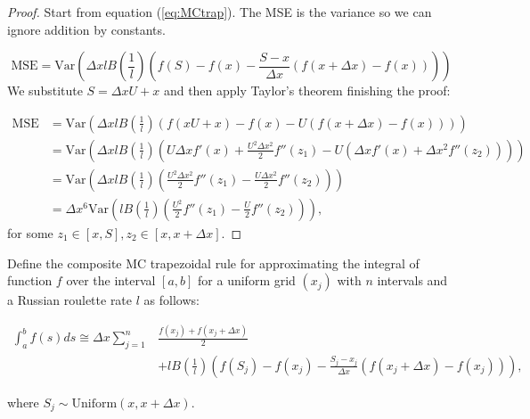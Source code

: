 \documentclass[a4paper,12pt]{article}
\begin{document}
\begin{proof}
    Start from equation (\ref{eq:MCtrap}). The MSE is the variance
    so we can ignore addition by constants.

    \begin{equation}
        \text{MSE} = \text{Var}\left( \Delta x l B\left( \frac{1}{l}\right)
        \left(f(S) - f(x) - \frac{S - x}{\Delta x}
        \left(f(x+\Delta x) - f(x)\right) \right)\right)
    \end{equation}
    We substitute $S = \Delta x U + x$ and then apply Taylor's theorem
    finishing the proof:

    \begin{align}
        \text{MSE} & = \text{Var}\left( \Delta x l B\left( \frac{1}{l}\right)
        \left(f(xU+x) - f(x) - U
        \left(f(x+\Delta x) - f(x)\right) \right)\right)                           \\
                   & = \text{Var}\left( \Delta x l B\left( \frac{1}{l}\right)
        \left( U \Delta x f'(x)+ \frac{U^{2} \Delta x ^{2}}{2} f''(z_{1})
        - U \left( \Delta x f'(x) +
        \Delta x ^{2} f''(z_{2})\right) \right)\right)                             \\
                   & = \text{Var}\left( \Delta x l B\left( \frac{1}{l}\right)
        \left( \frac{U^{2} \Delta x ^{2}}{2} f''(z_{1})
        -  \frac{U\Delta x ^{2}}{2} f''(z_{2}) \right)\right)                      \\
                   & =\Delta x ^{6} \text{Var}\left(  l B\left( \frac{1}{l}\right)
        \left( \frac{U^{2} }{2} f''(z_{1})
        -  \frac{U}{2} f''(z_{2}) \right)\right),
    \end{align}
    for some $z_{1} \in [x,S], z_{2} \in [x,x+\Delta x]$.
\end{proof}


\begin{definition} \label{MCtrap}
    Define the composite MC trapezoidal rule for approximating the integral
    of function $f$ over the interval $[a, b]$ for a uniform grid $(x_{j})$ with $n$
    intervals and a Russian roulette rate $l$ as follows:

    \begin{align} \label{eq:cMCtrap}
        \int_{a}^{b} f(s) ds \cong \Delta x \sum_{j=1}^{n} & \frac{f(x_{j}) + f(x_{j}+\Delta x)}{2} \nonumber \\
                                                           & + l B\left(\frac{1}{l}\right)
        \left(f(S_j) - f(x_{j}) - \frac{S_j - x_{j}}{\Delta x}(f(x_{j}+\Delta x) - f(x_{j}))\right),
    \end{align}

    where $S_j \sim \text{Uniform}(x,x+\Delta x)$.

\end{definition}
\end{document}
